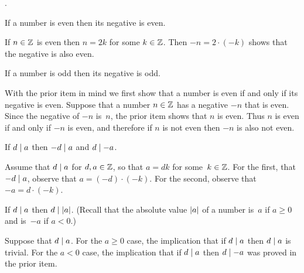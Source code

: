 \documentclass{test}  %
\begin{document}
\begin{problem}  
\label{ex:InteractionOfParityWithSign}
\pord.
\begin{exes}
  \begin{exercise}
    If a number is even then its negative is even.
  \end{exercise}
  \begin{answer}
    If $n\in\mathbb{Z}$ is even then $n=2k$ for some $k\in\mathbb{Z}$.
    Then $-n=2\cdot(-k)$ shows that the negative is also even.  
  \end{answer}
  \begin{exercise}
    If a number is odd then its negative is odd.
  \end{exercise}
  \begin{answer}
    With the prior item in mind we first show that a number is even
    if and only if its negative is even.
    Suppose that a number $n\in\mathbb{Z}$ has a negative $-n$ that is even.
    Since the negative of $-n$ is~$n$, the prior item shows that $n$ is even.
    Thus $n$ is even if and only if $-n$ is even, and therefore
    if $n$ is not even then $-n$ is also not even.
  \end{answer}
  \begin{exercise}
    If $d\mid a$ then $-d\mid a$ and $d\mid -a$.
  \end{exercise}
  \begin{answer}
    Assume that $d\mid a$ for $d,a\in\mathbb{Z}$, so that 
    $a=dk$ for some~$k\in\mathbb{Z}$.
    For the first, that $-d\mid a$, observe that
    $a=(-d)\cdot(-k)$.
    For the second, observe that $-a=d\cdot(-k)$.
  \end{answer}
  \begin{exercise}
    If $d\mid a$ then $d\mid\lvert a\rvert$.
    (Recall that the absolute value  $\lvert a\rvert$ of a number is~$a$ 
    if $a\geq 0$ and is~$-a$ if $a<0$.)
  \end{exercise}
  \begin{answer}
    Suppose that $d\mid a$.
    For the $a\geq 0$ case, the implication that if $d\mid a$ then 
    $d\mid a$ is trivial.
    For the $a<0$ case, 
    the implication that if $d\mid a$ then $d\mid -a$ was
    proved in the prior item.    
  \end{answer}
\end{exes}  
\end{problem}
\end{document}
